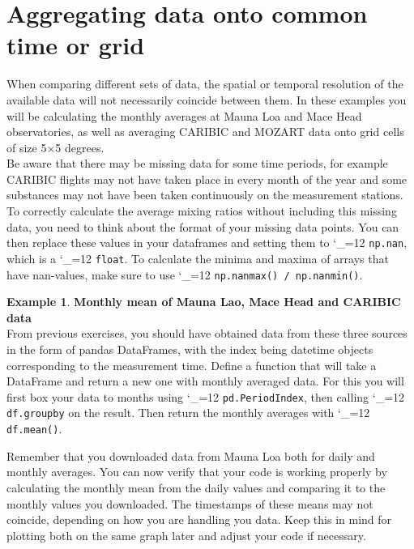 \documentclass{article}
\makeatletter
\newcommand{\pyf}{%
  \begingroup\catcode`_=12
  \pyf@
}
\newcommand{\pyf@}[1]{\texttt{#1}\endgroup}
\theoremstyle{definition}
\newtheorem{exmp}{Example}[section]
\makeatother
\begin{document}
\section{Aggregating data onto common time or grid}
When comparing different sets of data, the spatial or temporal resolution of the available data will not necessarily coincide between them. In these examples you will be calculating the monthly averages at Mauna Loa and Mace Head observatories, as well as averaging CARIBIC and MOZART data onto grid cells of size 5$\times$5 degrees. \\

Be aware that there may be missing data for some time periods, for example CARIBIC flights may not have taken place in every month of the year and some substances may not have been taken continuously on the measurement stations. To correctly calculate the average mixing ratios without including this missing data, you need to think about the format of your missing data points. You can then replace these values in your dataframes and setting them to \pyf{np.nan}, which is a \pyf{float}. To calculate the minima and maxima of arrays that have nan-values, make sure to use \pyf{np.nanmax() / np.nanmin()}. \\ 

\begin{exmp}\label{ex:monthly_mean} \textbf{Monthly mean of Mauna Lao, Mace Head and CARIBIC data} \\
From previous exercises, you should have obtained data from these three sources in the form of pandas DataFrames, with the index being datetime objects corresponding to the measurement time. Define a function that will take a DataFrame and return a new one with monthly averaged data. For this you will first box your data to months using \pyf{pd.PeriodIndex}, then calling \pyf{df.groupby} on the result. Then return the monthly averages with \pyf{df.mean()}. \end{exmp}

Remember that you downloaded data from Mauna Loa both for daily and monthly averages. You can now verify that your code is working properly by calculating the monthly mean from the daily values and comparing it to the monthly values you downloaded. The timestamps of these means may not coincide, depending on how you are handling you data. Keep this in mind for plotting both on the same graph later and adjust your code if necessary. \\
\end{document}
